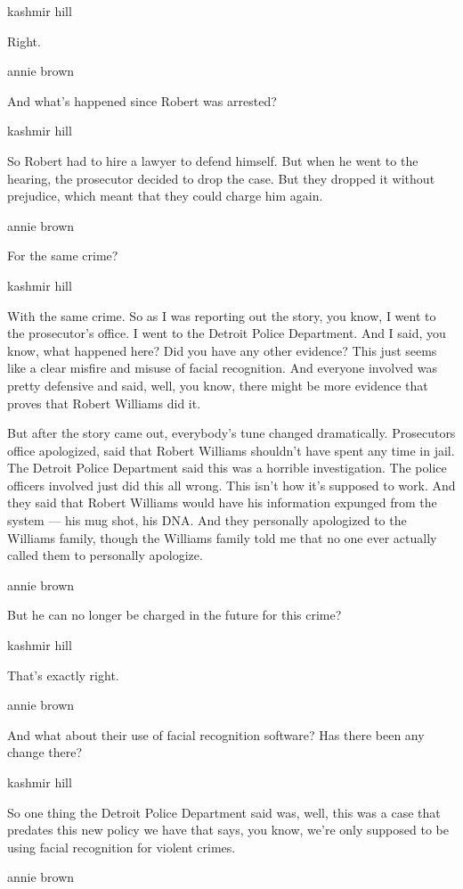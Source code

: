 kashmir hill

Right.

annie brown

And what's happened since Robert was arrested?

kashmir hill

So Robert had to hire a lawyer to defend himself. But when he went to
the hearing, the prosecutor decided to drop the case. But they dropped
it without prejudice, which meant that they could charge him again.

annie brown

For the same crime?

kashmir hill

With the same crime. So as I was reporting out the story, you know, I
went to the prosecutor's office. I went to the Detroit Police
Department. And I said, you know, what happened here? Did you have any
other evidence? This just seems like a clear misfire and misuse of
facial recognition. And everyone involved was pretty defensive and said,
well, you know, there might be more evidence that proves that Robert
Williams did it.

But after the story came out, everybody's tune changed dramatically.
Prosecutors office apologized, said that Robert Williams shouldn't have
spent any time in jail. The Detroit Police Department said this was a
horrible investigation. The police officers involved just did this all
wrong. This isn't how it's supposed to work. And they said that Robert
Williams would have his information expunged from the system --- his mug
shot, his DNA. And they personally apologized to the Williams family,
though the Williams family told me that no one ever actually called them
to personally apologize.

annie brown

But he can no longer be charged in the future for this crime?

kashmir hill

That's exactly right.

annie brown

And what about their use of facial recognition software? Has there been
any change there?

kashmir hill

So one thing the Detroit Police Department said was, well, this was a
case that predates this new policy we have that says, you know, we're
only supposed to be using facial recognition for violent crimes.

annie brown

